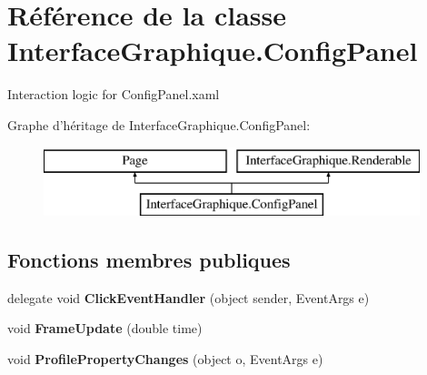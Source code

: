 \hypertarget{class_interface_graphique_1_1_config_panel}{\section{Référence de la classe Interface\-Graphique.\-Config\-Panel}
\label{class_interface_graphique_1_1_config_panel}
}


Interaction logic for Config\-Panel.\-xaml  


Graphe d'héritage de Interface\-Graphique.\-Config\-Panel\-:\begin{figure}[H]
\begin{center}
\leavevmode
\includegraphics[height=2.000000cm]{class_interface_graphique_1_1_config_panel}
\end{center}
\end{figure}
\subsection*{Fonctions membres publiques}
\begin{DoxyCompactItemize}
\item 
\hypertarget{class_interface_graphique_1_1_config_panel_ad4304d5a2f0476206ed7032aafcc0c8b}{delegate void {\bfseries Click\-Event\-Handler} (object sender, Event\-Args e)}\label{class_interface_graphique_1_1_config_panel_ad4304d5a2f0476206ed7032aafcc0c8b}

\item 
\hypertarget{class_interface_graphique_1_1_config_panel_a07483b31c963861c00ad56693a1869da}{void {\bfseries Frame\-Update} (double time)}\label{class_interface_graphique_1_1_config_panel_a07483b31c963861c00ad56693a1869da}

\item 
\hypertarget{class_interface_graphique_1_1_config_panel_a80c2d11adae87e83b29f801fcb267756}{void {\bfseries Profile\-Property\-Changes} (object o, Event\-Args e)}\label{class_interface_graphique_1_1_config_panel_a80c2d11adae87e83b29f801fcb267756}

\end{DoxyCompactItemize}
